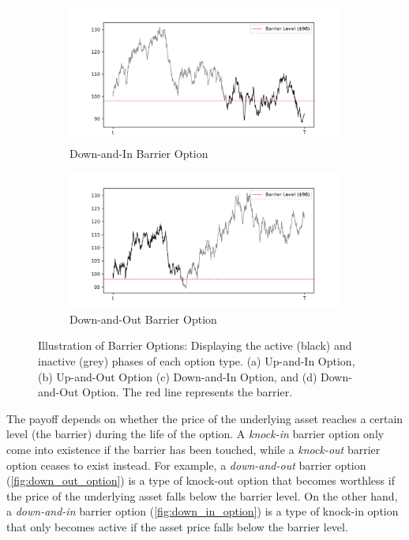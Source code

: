 \documentclass[a4paper]{report}
\begin{document}
\begin{figure}[H]
    \medskip
    \begin{subfigure}{.5\linewidth}
      \includegraphics[width=\linewidth]{images/down_in_option.png}
      \caption{Down-and-In Barrier Option}
      \label{fig:down_in_option}
    \end{subfigure}\hfill
    \begin{subfigure}{.5\linewidth}
      \includegraphics[width=\linewidth]{images/down_out_option.png}
      \caption{Down-and-Out Barrier Option}
      \label{fig:down_out_option}
    \end{subfigure}
    
    \caption{Illustration of Barrier Options: Displaying the active (black) and inactive (grey) phases of each option type. (a) Up-and-In Option, (b) Up-and-Out Option (c) Down-and-In Option, and (d) Down-and-Out Option. The red line represents the barrier.}
\end{figure}

The payoff depends on whether the price of the underlying asset reaches a certain level (the barrier) during the life of the option. A \textit{knock-in} barrier option only come into existence if the barrier has been touched, while a \textit{knock-out} barrier option ceases to exist instead. For example, a \textit{down-and-out} barrier option (\autoref{fig:down_out_option}) is a type of knock-out option that becomes worthless if the price of the underlying asset falls below the barrier level. On the other hand, a \textit{down-and-in} barrier option (\autoref{fig:down_in_option}) is a type of knock-in option that only becomes active if the asset price falls below the barrier level.
\end{document}
